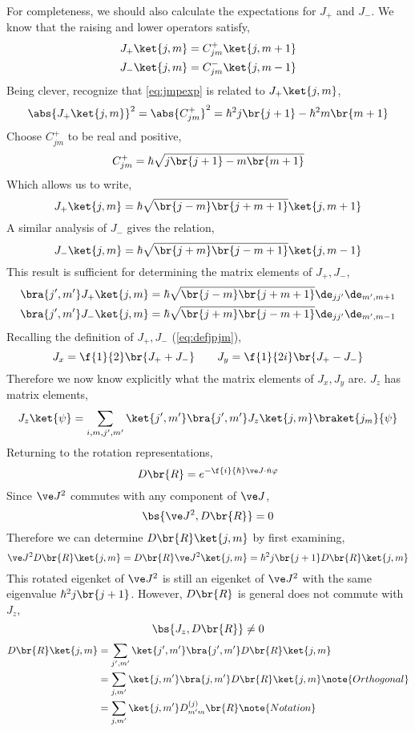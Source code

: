 \documentclass{article}
\begin{document}
For completeness, we should also calculate the expectations for $J_+$ and $J_-$. We know that the raising and lower operators satisfy,
\begin{align*}
J_+ \ket{j,m} &= C^{+}_{jm} \ket{j, m+1} \\
J_- \ket{j,m} &= C^{-}_{jm} \ket{j, m-1}
\end{align*}
Being clever, recognize that \cref{eq:jmpexp} is related to $J_+ \ket{j,m}$,
\[ \abs{J_+ \ket{j,m}}^2 = \abs{C^{+}_{jm}}^2 = \hbar^2 j \br{j+1} - \hbar^2 m\br{m+1} \]
Choose $C^{+}_{jm}$ to be real and positive,
\[C^{+}_{jm} = \hbar \sqrt{j \br{j+1} - m \br{m+1}} \]
Which allows us to write,
\[ J_+ \ket{j,m} = \hbar \sqrt{\br{j-m}\br{j+m+1}} \ket{j, m+1} \]
A similar analysis of $J_-$ gives the relation,
\[ J_- \ket{j,m} = \hbar \sqrt{\br{j+m}\br{j-m+1}} \ket{j, m-1} \]
This result is sufficient for determining the matrix elements of $J_+, J_-$,
\begin{align*}
    \bra{j',m'} J_+ \ket{j,m} &= \hbar \sqrt{\br{j-m}\br{j+m+1}} \de_{jj'}\de_{m', m+1}\\
    \bra{j',m'} J_- \ket{j,m} &= \hbar \sqrt{\br{j+m}\br{j-m+1}} \de_{jj'}\de_{m', m-1}
\end{align*}
Recalling the definition of $J_+, J_-$ (\cref{eq:defjpjm}),
\[ J_x = \f{1}{2}\br{J_+ + J_-} \qquad J_y = \f{1}{2i}\br{J_+ - J_-} \]
Therefore we now know explicitly what the matrix elements of $J_x, J_y$ are. $J_z$ has matrix elements,
\begin{align*}
    J_z \ket{\psi} = \sum_{i,m,j',m'} \ket{j',m'} \bra{j',m'} J_z \ket{j,m} \braket{j_m}{\psi}
\end{align*}
Returning to the rotation representations,
\[ D\br{R} = e^{-\f{i}{\hbar} \ve J \cdot \hat n \varphi} \]
Since $\ve J^2$ commutes with any component of $\ve J$,
\[ \bs{\ve J^2, D\br{R}} = 0 \]
Therefore we can determine $D\br{R}\ket{j,m}$ by first examining,
\[ \ve J^2D\br{R}\ket{j,m} = D\br{R}\ve J^2\ket{j,m} = \hbar^2 j \br{j+1} D\br{R} \ket{j,m} \]
This rotated eigenket of $\ve J^2$ is still an eigenket of $\ve J^2$ with the same eigenvalue $\hbar^2 j \br{j+1}$. However, $D\br{R}$ is general does not commute with $J_z$,
\[ \bs{J_z, D\br{R}} \neq 0 \]
\begin{align*}
    D\br{R} \ket{j,m}
    &= \sum_{j',m'} \ket{j', m'}\bra{j', m'} D\br{R} \ket{j,m} \\
    &= \sum_{j,m'} \ket{j, m'}\bra{j, m'} D\br{R} \ket{j,m} \note{Orthogonal}\\
    &= \sum_{j,m'} \ket{j, m'}D^{(j)}_{m'm} \br{R} \note{Notation}
\end{align*}
\end{document}
